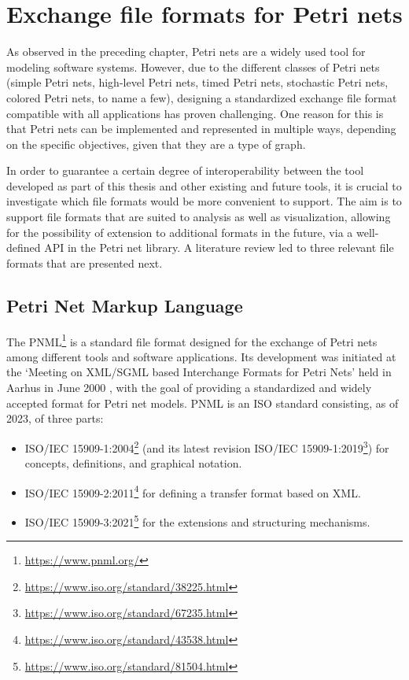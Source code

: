 \section{Exchange file formats for Petri nets}

As observed in the preceding chapter,
Petri nets are a widely used tool for modeling software systems.
However, due to the different classes of Petri nets
(simple Petri nets, high-level Petri nets, timed Petri nets,
stochastic Petri nets, colored Petri nets, to name a few),
designing a standardized exchange file format
compatible with all applications has proven challenging.
One reason for this is that
Petri nets can be implemented and represented in multiple ways,
depending on the specific objectives, given that they are a type of graph.

In order to guarantee a certain degree of interoperability between the tool developed
as part of this thesis and other existing and future tools, it is crucial
to investigate which file formats would be more convenient to support.
The aim is to support file formats that are suited to analysis as well as visualization,
allowing for the possibility of extension to additional formats in the future,
via a well-defined API in the Petri net library.
A literature review led to three relevant file formats that are presented next.

\subsection{Petri Net Markup Language}

The \acrfull{PNML}\footnote{\url{https://www.pnml.org/}}
is a standard file format designed
for the exchange of Petri nets
among different tools and software applications.
Its development was initiated
at the `Meeting on XML/SGML based Interchange Formats for Petri Nets'
held in Aarhus in June 2000 \cite{jungel2000petri,weber2003petri},
with the goal of providing
a standardized and widely accepted format for Petri net models.
PNML is an ISO standard consisting, as of 2023, of three parts:

\begin{itemize}
      \item ISO/IEC 15909-1:2004\footnote{\url{https://www.iso.org/standard/38225.html}}
            (and its latest revision ISO/IEC 15909-1:2019\footnote{\url{https://www.iso.org/standard/67235.html}})
            for concepts, definitions, and graphical notation.
      \item ISO/IEC 15909-2:2011\footnote{\url{https://www.iso.org/standard/43538.html}}
            for defining a transfer format based on XML.
      \item ISO/IEC 15909-3:2021\footnote{\url{https://www.iso.org/standard/81504.html}}
            for the extensions and structuring mechanisms.
\end{itemize}

